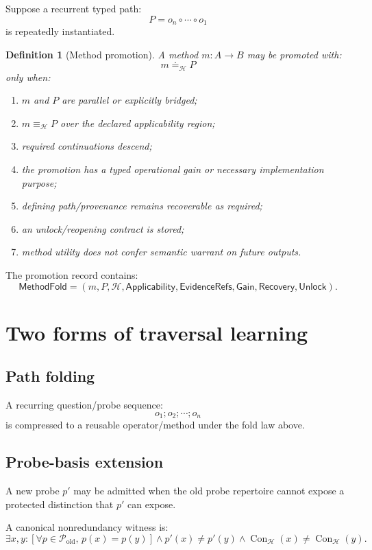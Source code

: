 \documentclass[11pt,oneside]{article}
\newtheorem{definition}{Definition}[section]
\newcommand{\Con}{\operatorname{Con}}
\begin{document}
Suppose a recurrent typed path:
\[
P=o_n\circ\cdots\circ o_1
\]
is repeatedly instantiated.

\begin{definition}[Method promotion]
A method \(m:A\to B\) may be promoted with:
\[
m\doteq_{\mathcal H}P
\]
only when:
\begin{enumerate}
\item \(m\) and \(P\) are parallel or explicitly bridged;
\item \(m\equiv_{\mathcal H}P\) over the declared applicability region;
\item required continuations descend;
\item the promotion has a typed operational gain or necessary implementation purpose;
\item defining path/provenance remains recoverable as required;
\item an unlock/reopening contract is stored;
\item method utility does not confer semantic warrant on future outputs.
\end{enumerate}
\end{definition}

The promotion record contains:
\[
\boxed{
\mathsf{MethodFold}
=
(
m,P,\mathcal H,\mathsf{Applicability},
\mathsf{EvidenceRefs},\mathsf{Gain},
\mathsf{Recovery},\mathsf{Unlock}
).
}
\]

\section{Two forms of traversal learning}

\subsection{Path folding}

A recurring question/probe sequence:
\[
o_1;o_2;\cdots;o_n
\]
is compressed to a reusable operator/method under the fold law above.

\subsection{Probe-basis extension}

A new probe \(p'\) may be admitted when the old probe repertoire cannot expose a protected distinction that \(p'\) can expose.

A canonical nonredundancy witness is:
\[
\boxed{
\exists x,y:
\left[
\forall p\in\mathcal P_{\mathrm{old}},\,
p(x)=p(y)
\right]
\land
p'(x)\neq p'(y)
\land
\Con_{\mathcal H}(x)\neq\Con_{\mathcal H}(y).
}
\]
\end{document}
